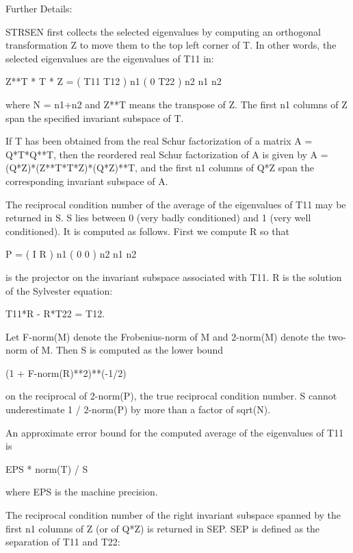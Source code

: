 \begin{DoxyParagraph}{Further Details\+: }
\begin{DoxyVerb}  STRSEN first collects the selected eigenvalues by computing an
  orthogonal transformation Z to move them to the top left corner of T.
  In other words, the selected eigenvalues are the eigenvalues of T11
  in:

          Z**T * T * Z = ( T11 T12 ) n1
                         (  0  T22 ) n2
                            n1  n2

  where N = n1+n2 and Z**T means the transpose of Z. The first n1 columns
  of Z span the specified invariant subspace of T.

  If T has been obtained from the real Schur factorization of a matrix
  A = Q*T*Q**T, then the reordered real Schur factorization of A is given
  by A = (Q*Z)*(Z**T*T*Z)*(Q*Z)**T, and the first n1 columns of Q*Z span
  the corresponding invariant subspace of A.

  The reciprocal condition number of the average of the eigenvalues of
  T11 may be returned in S. S lies between 0 (very badly conditioned)
  and 1 (very well conditioned). It is computed as follows. First we
  compute R so that

                         P = ( I  R ) n1
                             ( 0  0 ) n2
                               n1 n2

  is the projector on the invariant subspace associated with T11.
  R is the solution of the Sylvester equation:

                        T11*R - R*T22 = T12.

  Let F-norm(M) denote the Frobenius-norm of M and 2-norm(M) denote
  the two-norm of M. Then S is computed as the lower bound

                      (1 + F-norm(R)**2)**(-1/2)

  on the reciprocal of 2-norm(P), the true reciprocal condition number.
  S cannot underestimate 1 / 2-norm(P) by more than a factor of
  sqrt(N).

  An approximate error bound for the computed average of the
  eigenvalues of T11 is

                         EPS * norm(T) / S

  where EPS is the machine precision.

  The reciprocal condition number of the right invariant subspace
  spanned by the first n1 columns of Z (or of Q*Z) is returned in SEP.
  SEP is defined as the separation of T11 and T22:


\end{DoxyVerb}
\end{DoxyParagraph}
